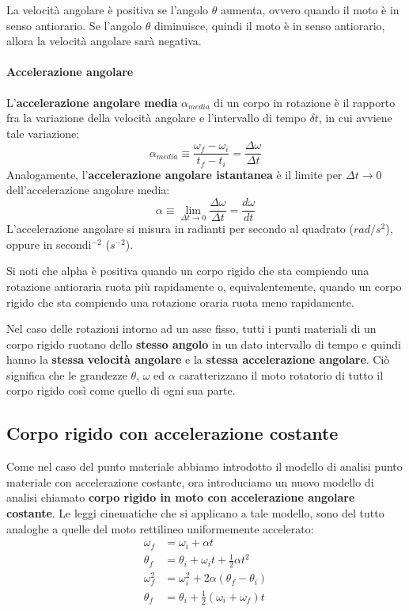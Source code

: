\documentclass[a4paper,11pt,oneside]{book}
\begin{document}
La velocità angolare è positiva se l'angolo $\theta$ aumenta, ovvero quando il moto è in senso antiorario. Se l'angolo $\theta$ diminuisce, quindi il moto è
in senso antiorario, allora la velocità angolare sarà negativa.

\paragraph{Accelerazione angolare}
L’\textbf{accelerazione angolare media} $\alpha_{media}$ di un corpo in rotazione è il rapporto fra la variazione della velocità angolare e l’intervallo di tempo $\delta t$, in cui avviene tale variazione:
\begin{equation*}
    \alpha_{media} \equiv \frac{\omega_f - \omega_i}{t_f - t_i} = \frac{\Delta \omega}{\Delta t}
\end{equation*}
Analogamente, l'\textbf{accelerazione angolare istantanea} è il limite per $\Delta t \to 0$ dell'accelerazione angolare media:
\begin{equation*}
    \alpha \equiv \lim_{\Delta t \to 0} \frac{\Delta \omega}{\Delta t} = \frac{d\omega}{dt}
\end{equation*}
L’accelerazione angolare si misura in radianti per secondo al quadrato ($rad/s^{2}$), oppure in secondi$^{-2}$ ($s^{-2}$).

Si noti che alpha è positiva quando un corpo rigido che sta compiendo una rotazione antioraria ruota più rapidamente o, equivalentemente, quando un corpo rigido che sta compiendo una rotazione oraria ruota meno rapidamente.

Nel caso delle rotazioni intorno ad un asse fisso, tutti i punti materiali di un corpo rigido ruotano dello \textbf{stesso angolo} in un dato intervallo di tempo e quindi hanno la \textbf{stessa} \textbf{velocità angolare} e la \textbf{stessa accelerazione angolare}. 
Ciò significa che le grandezze $\theta$, $\omega$ ed $\alpha$ caratterizzano il moto rotatorio di tutto il corpo rigido così come quello di ogni sua parte.

\subsection{Corpo rigido con accelerazione costante}
Come nel caso del punto materiale abbiamo introdotto il modello di analisi punto materiale con accelerazione costante, ora introduciamo un nuovo 
modello di analisi chiamato \textbf{corpo rigido in moto con accelerazione angolare costante}.
Le leggi cinematiche che si applicano a tale modello, sono del tutto analoghe a quelle del moto rettilineo uniformemente accelerato:
\begin{align*}
    \omega_f &= \omega_i + \alpha t \\
    \theta_f &= \theta_i + \omega_i t + \tfrac{1}{2} \alpha t^2 \\ 
    \omega_f^2 &= \omega_i^2 + 2\alpha (\theta_f - \theta_i) \\
    \theta_f &= \theta_i + \tfrac{1}{2}(\omega_i + \omega_f) t
\end{align*}
\end{document}
